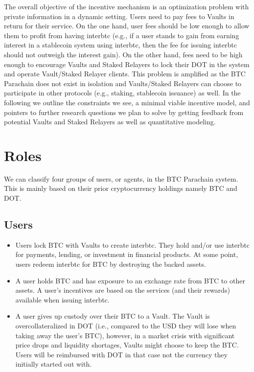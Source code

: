 \documentclass[a4paper,10pt,english]{sphinxmanual}
\begin{document}
The overall objective of the incentive mechanism is an optimization problem with private information in a dynamic setting. Users need to pay fees to Vaults in return for their service. On the one hand, user fees should be low enough to allow them to profit from having interbtc (e.g., if a user stands to gain from earning interest in a stablecoin system using interbtc, then the fee for issuing interbtc should not outweigh the interest gain). On the other hand, fees need to be high enough to encourage Vaults and Staked Relayers to lock their DOT in the system and operate Vault/Staked Relayer clients. This problem is amplified as the BTC Parachain does not exist in isolation and Vaults/Staked Relayers can choose to participate in other protocols (e.g., staking, stablecoin issuance) as well. In the following we outline the constraints we see, a minimal viable incentive model, and pointers to further research questions we plan to solve by getting feedback from potential Vaults and Staked Relayers as well as quantitative modeling.


\section{Roles}
\label{\detokenize{economics/incentives:roles}}
We can classify four groups of users, or agents, in the BTC Parachain system. This is mainly based on their prior cryptocurrency holdings \sphinxhyphen{} namely BTC and DOT.


\subsection{Users}
\label{\detokenize{economics/incentives:users}}\begin{itemize}
\item {} 
 Users lock BTC with Vaults to create interbtc. They hold and/or use interbtc for payments, lending, or investment in financial products. At some point, users redeem interbtc for BTC by destroying the backed assets.

\item {} 
 A user holds BTC and has exposure to an exchange rate from BTC to other assets. A user’s incentives are based on the services (and their rewards) available when issuing interbtc.

\item {} 
 A user gives up custody over their BTC to a Vault. The Vault is over\sphinxhyphen{}collateralized in DOT (i.e., compared to the USD they will lose when taking away the user’s BTC), however, in a market crisis with significant price drops and liquidity shortages, Vaults might choose to keep the BTC. Users will be reimbursed with DOT in that case \sphinxhyphen{} not the currency they initially started out with.

\end{itemize}
\end{document}
